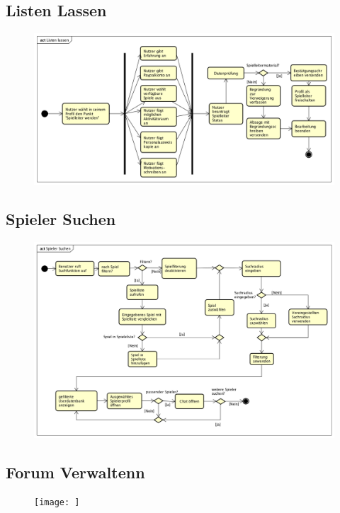 \vfill

\subsection*{Listen Lassen}
\begin{figure}[h!]
	\centering
	\includegraphics[width=0.8\linewidth]{docs/3_Aktivitaetsdiagramme/Markus/Listen_Lassen.png}
	\label{fig:ActDia_Listen_Lassen}
\end{figure}

\vfill

\pagebreak

\vfill

\subsection*{Spieler Suchen}
\begin{figure}[h!]
	\centering
	\includegraphics[width=0.8\linewidth]{docs/3_Aktivitaetsdiagramme/Markus/Spieler_Suchen.png}
	\label{fig:ActDia_Spieler_Suchen}
\end{figure}

\vfill

\subsection*{Forum Verwaltenn}
\begin{figure}[h!]
	\centering
	\texttt{[image: ]}
	\label{fig:ActDia_Forum-Verwalten}
\end{figure}